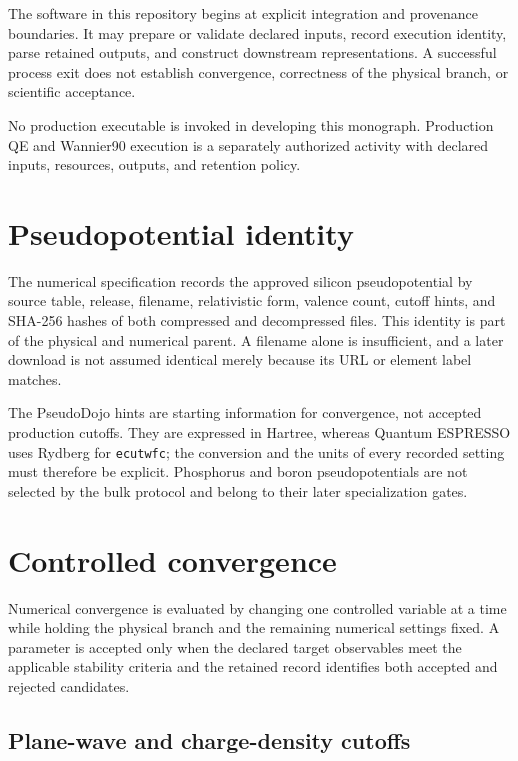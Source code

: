 The software in this repository begins at explicit integration and provenance
boundaries. It may prepare or validate declared inputs, record execution
identity, parse retained outputs, and construct downstream representations. A
successful process exit does not establish convergence, correctness of the
physical branch, or scientific acceptance.

No production executable is invoked in developing this monograph. Production
QE and Wannier90 execution is a separately authorized activity with declared
inputs, resources, outputs, and retention policy.

\section{Pseudopotential identity}

The numerical specification records the approved silicon pseudopotential by
source table, release, filename, relativistic form, valence count, cutoff hints,
and SHA-256 hashes of both compressed and decompressed files. This identity is
part of the physical and numerical parent. A filename alone is insufficient,
and a later download is not assumed identical merely because its URL or element
label matches.

The PseudoDojo hints are starting information for convergence, not accepted
production cutoffs. They are expressed in Hartree, whereas Quantum ESPRESSO
uses Rydberg for \texttt{ecutwfc}; the conversion and the units of every
recorded setting must therefore be explicit. Phosphorus and boron
pseudopotentials are not selected by the bulk protocol and belong to their
later specialization gates.

\section{Controlled convergence}

Numerical convergence is evaluated by changing one controlled variable at a
time while holding the physical branch and the remaining numerical settings
fixed. A parameter is accepted only when the declared target observables meet
the applicable stability criteria and the retained record identifies both
accepted and rejected candidates.

\subsection{Plane-wave and charge-density cutoffs}


